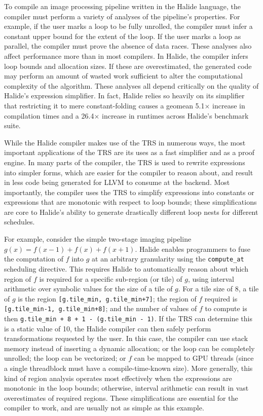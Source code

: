 To compile an image processing pipeline written in the
  Halide language, the compiler must perform a variety of analyses of
  the pipeline's properties. For example, if the user marks a
  loop to be fully unrolled, the compiler must infer a constant upper
  bound for the extent of the loop. If the user marks
  a loop as parallel, the compiler must prove the absence of data
  races. These analyses also affect performance more than in most
  compilers. In Halide, the compiler infers loop bounds and allocation sizes.
  If these are overestimated, the generated code may
  perform an amount of wasted work sufficient to alter the
  computational complexity of the algorithm. These analyses all depend
  critically on the quality of Halide's expression simplifier. In
  fact, Halide relies so heavily on its simplifier that restricting it
  to mere constant-folding causes a geomean 5.1$\times$ increase in
  compilation times and a 26.4$\times$ increase in runtimes across
  Halide's benchmark suite.  

While the Halide compiler makes use of the TRS in numerous ways, the most important
  applications of the TRS are its uses as a fast simplifier and as a proof engine.  
  In many parts of the compiler, the TRS is used to rewrite expressions into simpler forms,
  which are easier for the compiler to reason about, and result in less code being generated for
  LLVM to consume at the backend.  Most importantly, the compiler uses the TRS to simplify expressions
  into constants or expressions that are monotonic with respect to loop bounds; these simplifications are core to Halide's
  ability to generate drastically different loop nests for different schedules.

For example, consider the simple two-stage imaging pipeline $g(x) = f(x - 1) + f(x) + f(x + 1)$.
  Halide enables programmers to fuse the computation of $f$ into $g$ at an arbitrary granularity
  using the \texttt{compute\_at} scheduling directive.  This requires Halide to automatically reason
  about which region of $f$ is required for a specific sub-region (or tile) of $g$, using interval
  arithmetic over symbolic values for the size of a tile of $g$.  For a tile size of 8, a tile of $g$
  is the region \texttt{[g.tile\_min, g.tile\_min+7]};  the region of $f$ required is
  \texttt{[g.tile\_min-1, g.tile\_min+8]}; and the number of values of $f$ to compute is then
  \texttt{g.tile\_min + 8 + 1 - (g.tile\_min - 1)}.  If the TRS can determine this is a static value
  of 10, the Halide compiler can then safely perform transformations requested by the user.  In this
  case, the compiler can use stack memory instead of inserting a dynamic allocation; or the loop can be
  completely unrolled; the loop can be vectorized; or $f$ can be mapped to GPU threads (since a single
  threadblock must have a compile-time-known size).  More generally, this kind of region analysis
  operates most effectively when the expressions are monotonic in the loop bounds; otherwise, interval
  arithmetic can result in vast overestimates of required regions.  These simplifications are essential
  for the compiler to work, and are usually not as simple as this example.

